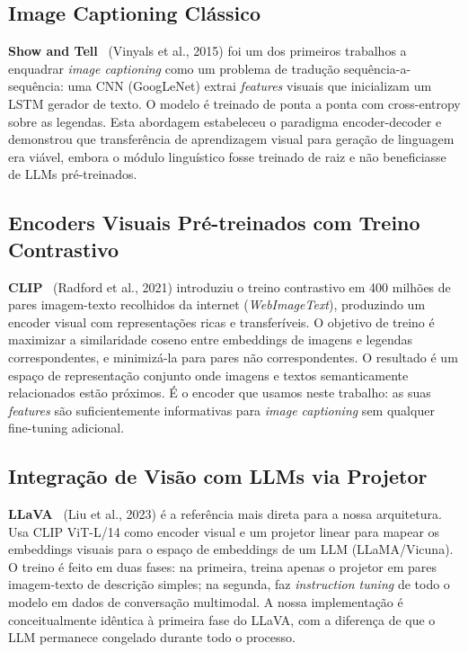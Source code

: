 \documentclass[conference]{IEEEtran}
\begin{document}
\subsection{Image Captioning Clássico}

\textbf{Show and Tell}~\cite{b4} (Vinyals et al., 2015) foi um dos primeiros trabalhos a enquadrar \textit{image captioning} como um problema de tradução sequência-a-sequência: uma CNN (GoogLeNet) extrai \textit{features} visuais que inicializam um LSTM gerador de texto. O modelo é treinado de ponta a ponta com cross-entropy sobre as legendas. Esta abordagem estabeleceu o paradigma encoder-decoder e demonstrou que transferência de aprendizagem visual para geração de linguagem era viável, embora o módulo linguístico fosse treinado de raiz e não beneficiasse de LLMs pré-treinados.

\subsection{Encoders Visuais Pré-treinados com Treino Contrastivo}

\textbf{CLIP}~\cite{b3} (Radford et al., 2021) introduziu o treino contrastivo em 400 milhões de pares imagem-texto recolhidos da internet (\textit{WebImageText}), produzindo um encoder visual com representações ricas e transferíveis. O objetivo de treino é maximizar a similaridade coseno entre embeddings de imagens e legendas correspondentes, e minimizá-la para pares não correspondentes. O resultado é um espaço de representação conjunto onde imagens e textos semanticamente relacionados estão próximos. É o encoder que usamos neste trabalho: as suas \textit{features} são suficientemente informativas para \textit{image captioning} sem qualquer fine-tuning adicional.

\subsection{Integração de Visão com LLMs via Projetor}

\textbf{LLaVA}~\cite{b1} (Liu et al., 2023) é a referência mais direta para a nossa arquitetura. Usa CLIP ViT-L/14 como encoder visual e um projetor linear para mapear os embeddings visuais para o espaço de embeddings de um LLM (LLaMA/Vicuna). O treino é feito em duas fases: na primeira, treina apenas o projetor em pares imagem-texto de descrição simples; na segunda, faz \textit{instruction tuning} de todo o modelo em dados de conversação multimodal. A nossa implementação é conceitualmente idêntica à primeira fase do LLaVA, com a diferença de que o LLM permanece congelado durante todo o processo.
\end{document}
